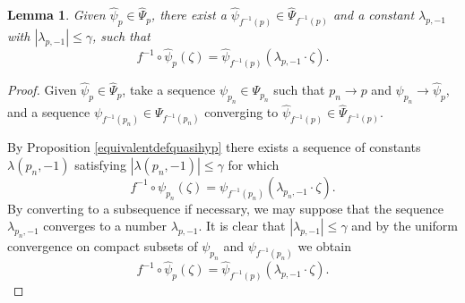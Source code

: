 \documentclass[10pt,a4paper]{article}
\newtheorem{lemma}[theorem]{Lemma}
\begin{document}
\begin{lemma}
\label{BresciaSuni}
Given $\widehat\psi_p\in\widehat\Psi_p$, there exist a $\widehat\psi_{f^{-1}(p)}\in\widehat\Psi_{f^{-1}(p)}$ and a constant $\lambda_{p,-1}$ with $|\lambda_{p,-1}|\leq\gamma$, such that
\[
f^{-1}\circ\widehat\psi_p(\zeta)=\widehat\psi_{f^{-1}(p)}(\lambda_{p,-1} \cdot \zeta).
\]
\end{lemma}
\begin{proof}
Given $\widehat\psi_p\in\widehat \Psi_p$, take a sequence $\psi_{p_n}\in\Psi_{p_n}$ such that $p_n\to p$ and $\psi_{p_n}\to\widehat\psi_p$, and a sequence $\psi_{f^{-1}(p_n)}\in\Psi_{f^{-1}(p_n)}$ converging to $\widehat\psi_{f^{-1}(p)}\in\widehat\Psi_{f^{-1}(p)}$.

By Proposition \ref{equivalentdefquasihyp} there exists a sequence of constants $\lambda(p_n,-1)$ satisfying $|\lambda(p_n,-1)|\leq\gamma$ for which
\[
f^{-1}\circ \psi_{p_n}(\zeta)=\psi_{f^{-1}(p_n)}(\lambda_{p_n,-1}\cdot \zeta).
\]
By converting to a subsequence if necessary, we may suppose that the sequence $\lambda_{p_n,-1}$ converges to a number $\lambda_{p,-1}$. It is clear that $|\lambda_{p,-1}|\leq \gamma$ and by the uniform convergence on compact subsets of $\psi_{p_n}$ and $\psi_{f^{-1}(p_n)}$ we obtain
\[
f^{-1}\circ\widehat\psi_p(\zeta)=\widehat\psi_{f^{-1}(p)}(\lambda_{p,-1} \cdot \zeta).
\]
\end{proof}
\end{document}
